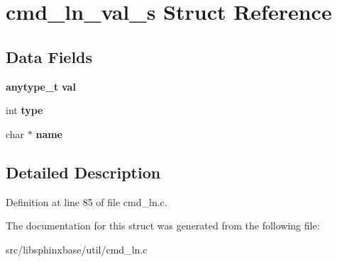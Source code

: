\section{cmd\-\_\-ln\-\_\-val\-\_\-s Struct Reference}
\label{structcmd__ln__val__s}
\subsection*{Data Fields}
\begin{DoxyCompactItemize}
\item 
{\bf anytype\-\_\-t} {\bfseries val}\label{structcmd__ln__val__s_a6eec646e3d179bd16df60f5a74281835}

\item 
int {\bfseries type}\label{structcmd__ln__val__s_a87bda73148555d31c70d7283d360aadf}

\item 
char $\ast$ {\bfseries name}\label{structcmd__ln__val__s_ad0fd5c6eb452608ac187c253f5790ceb}

\end{DoxyCompactItemize}


\subsection{Detailed Description}


Definition at line 85 of file cmd\-\_\-ln.\-c.



The documentation for this struct was generated from the following file\-:\begin{DoxyCompactItemize}
\item 
src/libsphinxbase/util/cmd\-\_\-ln.\-c\end{DoxyCompactItemize}
